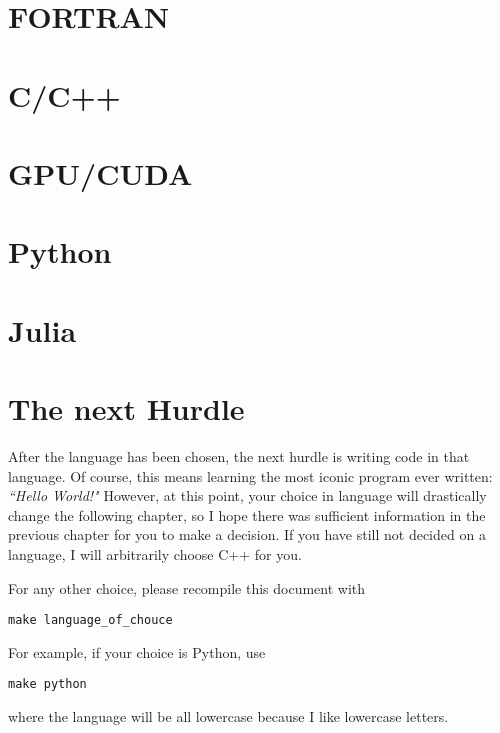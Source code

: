 \section*{FORTRAN}
\section*{C/C++}
\section*{GPU/CUDA}
\section*{Python}
\section*{Julia}

\section*{The next Hurdle}
After the language has been chosen, the next hurdle is writing code in that language. 
Of course, this means learning the most iconic program ever written: \textit{``Hello World!"}
However, at this point, your choice in language will drastically change the following chapter, so I hope there was sufficient information in the previous chapter for you to make a decision.
If you have still not decided on a language, I will arbitrarily choose C++ for you.

For any other choice, please recompile this document with 

\begin{lstlisting}
make language_of_chouce
\end{lstlisting}

For example, if your choice is Python, use

\begin{lstlisting}
make python
\end{lstlisting}

where the language will be all lowercase because I like lowercase letters.